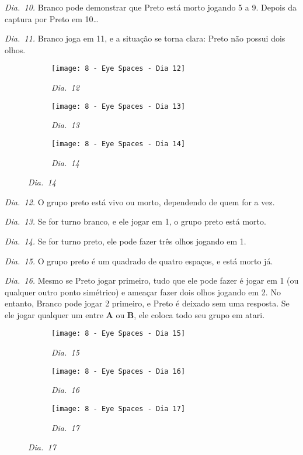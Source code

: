 \emph{Dia.\@~10.} Branco pode demonstrar que Preto está morto jogando 5 a 9. Depois da captura por Preto em 10\ldots

\emph{Dia.\@~11.} Branco joga em 11, e a situação se torna clara: Preto não possui dois olhos.

\begin{figure}[h!]
    \centering
    \begin{subfigure}[t]{.31\textwidth}
        \texttt{[image: 8 - Eye Spaces - Dia 12]}
        \captionsetup{justification=centering}
        \caption*{\emph{Dia.\@~12}}
    \end{subfigure}
    \hfill
    \begin{subfigure}[t]{.31\textwidth}
        \texttt{[image: 8 - Eye Spaces - Dia 13]}
        \captionsetup{justification=centering}
        \caption*{\emph{Dia.\@~13}}
    \end{subfigure}
    \hfill
    \begin{subfigure}[t]{.31\textwidth}
        \texttt{[image: 8 - Eye Spaces - Dia 14]}
        \captionsetup{justification=centering}
        \caption*{\emph{Dia.\@~14}}
    \end{subfigure}
\end{figure}

\emph{Dia.\@~12.} O grupo preto está vivo ou morto, dependendo de quem for a vez.

\emph{Dia.\@~13.} Se for turno branco, e ele jogar em 1, o grupo preto está morto.

\emph{Dia.\@~14.} Se for turno preto, ele pode fazer três olhos jogando em 1.

\pagebreak

\emph{Dia.\@~15.} O grupo preto é um quadrado de quatro espaços, e está morto já.

\emph{Dia.\@~16.} Mesmo se Preto jogar primeiro, tudo que ele pode fazer é jogar em 1 (ou qualquer outro ponto simétrico) e ameaçar fazer dois olhos jogando em 2. No entanto, Branco pode jogar 2 primeiro, e Preto é deixado sem uma resposta. Se ele jogar qualquer um entre \textbf{A} ou \textbf{B}, ele coloca todo seu grupo em atari.

\begin{figure}[h!]
    \centering
    \begin{subfigure}[t]{.31\textwidth}
        \texttt{[image: 8 - Eye Spaces - Dia 15]}
        \captionsetup{justification=centering}
        \caption*{\emph{Dia.\@~15}}
    \end{subfigure}
    \hfill
    \begin{subfigure}[t]{.31\textwidth}
        \texttt{[image: 8 - Eye Spaces - Dia 16]}
        \captionsetup{justification=centering}
        \caption*{\emph{Dia.\@~16}}
    \end{subfigure}
    \hfill
    \begin{subfigure}[t]{.31\textwidth}
        \texttt{[image: 8 - Eye Spaces - Dia 17]}
        \captionsetup{justification=centering}
        \caption*{\emph{Dia.\@~17}}
    \end{subfigure}
\end{figure}


